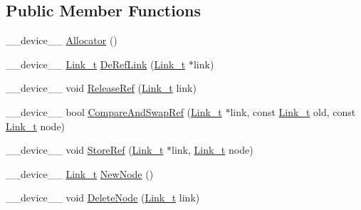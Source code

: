 \subsection*{Public Member Functions}
\begin{DoxyCompactItemize}
\item 
\+\_\+\+\_\+device\+\_\+\+\_\+ \mbox{\hyperlink{class_n_u_c_a_r_lock_free_d_s_1_1_allocator_adc2d0f788ae4d12cdfb3b2d3e8075c77}{Allocator}} ()
\item 
\+\_\+\+\_\+device\+\_\+\+\_\+ \mbox{\hyperlink{class_n_u_c_a_r_lock_free_d_s_1_1_allocator_a5508d82b795e6c1977bebb67b5e5b686}{Link\+\_\+t}} \mbox{\hyperlink{class_n_u_c_a_r_lock_free_d_s_1_1_allocator_a02c5eef54aaebcad88edb0e87d5b7557}{De\+Ref\+Link}} (\mbox{\hyperlink{class_n_u_c_a_r_lock_free_d_s_1_1_allocator_a5508d82b795e6c1977bebb67b5e5b686}{Link\+\_\+t}} $\ast$link)
\item 
\+\_\+\+\_\+device\+\_\+\+\_\+ void \mbox{\hyperlink{class_n_u_c_a_r_lock_free_d_s_1_1_allocator_a7c4e8ba73a5018483ca63c09f94daca3}{Release\+Ref}} (\mbox{\hyperlink{class_n_u_c_a_r_lock_free_d_s_1_1_allocator_a5508d82b795e6c1977bebb67b5e5b686}{Link\+\_\+t}} link)
\item 
\+\_\+\+\_\+device\+\_\+\+\_\+ bool \mbox{\hyperlink{class_n_u_c_a_r_lock_free_d_s_1_1_allocator_a9eeb962b3169fa2bdffe85e7d682dfa9}{Compare\+And\+Swap\+Ref}} (\mbox{\hyperlink{class_n_u_c_a_r_lock_free_d_s_1_1_allocator_a5508d82b795e6c1977bebb67b5e5b686}{Link\+\_\+t}} $\ast$link, const \mbox{\hyperlink{class_n_u_c_a_r_lock_free_d_s_1_1_allocator_a5508d82b795e6c1977bebb67b5e5b686}{Link\+\_\+t}} old, const \mbox{\hyperlink{class_n_u_c_a_r_lock_free_d_s_1_1_allocator_a5508d82b795e6c1977bebb67b5e5b686}{Link\+\_\+t}} node)
\item 
\+\_\+\+\_\+device\+\_\+\+\_\+ void \mbox{\hyperlink{class_n_u_c_a_r_lock_free_d_s_1_1_allocator_a08cd8b51995e5cebbc937a3a01aa1eff}{Store\+Ref}} (\mbox{\hyperlink{class_n_u_c_a_r_lock_free_d_s_1_1_allocator_a5508d82b795e6c1977bebb67b5e5b686}{Link\+\_\+t}} $\ast$link, \mbox{\hyperlink{class_n_u_c_a_r_lock_free_d_s_1_1_allocator_a5508d82b795e6c1977bebb67b5e5b686}{Link\+\_\+t}} node)
\item 
\+\_\+\+\_\+device\+\_\+\+\_\+ \mbox{\hyperlink{class_n_u_c_a_r_lock_free_d_s_1_1_allocator_a5508d82b795e6c1977bebb67b5e5b686}{Link\+\_\+t}} \mbox{\hyperlink{class_n_u_c_a_r_lock_free_d_s_1_1_allocator_a4749c1ddff91fcdff56e750545a6790a}{New\+Node}} ()
\item 
\+\_\+\+\_\+device\+\_\+\+\_\+ void \mbox{\hyperlink{class_n_u_c_a_r_lock_free_d_s_1_1_allocator_a3f2abafd921e216ec08249198da2d3d2}{Delete\+Node}} (\mbox{\hyperlink{class_n_u_c_a_r_lock_free_d_s_1_1_allocator_a5508d82b795e6c1977bebb67b5e5b686}{Link\+\_\+t}} link)
\end{DoxyCompactItemize}
